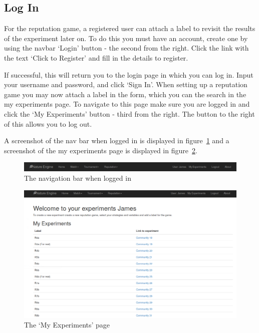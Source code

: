 \documentclass[]{final_report}
\begin{document}
\subsection{Log In}
For the reputation game, a registered user can attach a label to revisit the results of the experiment later on. To do this you must have an account, create one by using the navbar `Login' button - the second from the right. Click the link with the text `Click to Register' and fill in the details to register.\par
If successful, this will return you to the login page in which you can log in. Input your username and password, and click `Sign In'. When setting up a reputation game you may now attach a label in the form, which you can the search in the my experiments page. To navigate to this page make sure you are logged in and click the `My Experiments' button - third from the right. The button to the right of this allows you to log out.\par 
A screenshot of the nav bar when logged in is displayed in figure~\ref{fig:navbar2} and a screenshot of the my experiments page is displayed in figure~\ref{fig:my_experiments}.
\begin{figure}
	\includegraphics[width=\textwidth]{NavBar2.png}
	\caption{The navigation bar when logged in}
	\label{fig:navbar2}
\end{figure}
\begin{figure}
	\includegraphics[width=\textwidth]{MyExperiments.png}
	\caption{The `My Experiments' page}
	\label{fig:my_experiments}
\end{figure}
\end{document}
